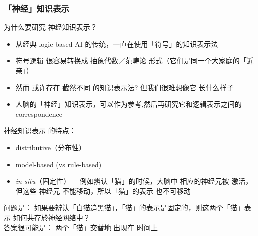 \documentclass[16pt]{beamer}
\newcommand{\emp}[1]{{\color{violet}#1}}
\begin{document}
%	

\begin{frame}
\frametitle{「神经」知识表示}
为什么要研究 神经知识表示？
\begin{itemize}
	\item 从经典 logic-based AI 的传统，一直在使用「符号」的知识表示法

	\item 符号逻辑 很容易转换成 抽象代数／范畴论 形式（它们是同一个大家庭的「近亲」）
	
	\item 然而 或许存在 截然不同 的知识表示法? 但我们很难想像它 \emp{长什么样子}

	\item 人脑的「神经」知识表示，可以作为参考,然后再研究它和逻辑表示之间的 correspondence
\end{itemize}

\vspace*{0.4cm} 神经知识表示 的特点：
\begin{itemize}
	\item distributive（分布性）

	\item model-based (vs rule-based)

	\item \textit{in situ}（固定性）--- 例如辨认「猫」的时候，大脑中 相应的神经元被 激活，但这些 神经元 \emp{不能移动}，所以「猫」的表示 也不可移动
\end{itemize}
问题是： 如果要辨认「白猫追黑猫」，「猫」的表示是固定的，则这两个「猫」表示 如何\emp{共存}於神经网络中？\\
答案很可能是： 两个「猫」\emp{交替}地 出现在 \emp{时间}上
\end{frame}
\end{document}
